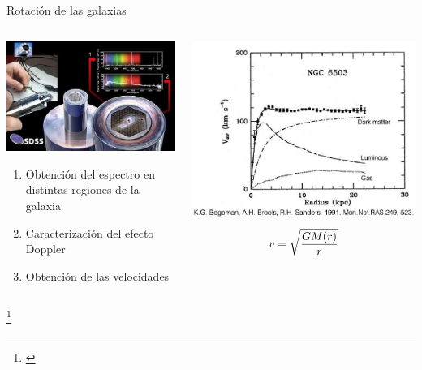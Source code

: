 \documentclass[handout]{beamer}
\newcommand\blfootnote[1]
{%
	\begingroup
	\renewcommand\thefootnote{}\footnote{#1}%
	\addtocounter{footnote}{-1}%
	\endgroup
}
\newcommand{\fcite}[1]{\blfootnote{\cite{#1}}}
\begin{document}
\begin{frame}{Rotación de las galaxias}
	\begin{columns}
		\begin{column}{0.6\textwidth}
			\includegraphics[width = 0.9\linewidth]{sources/images/SDSS.jpg} \\
			\begin{enumerate}
				\item Obtención del espectro en distintas regiones de la galaxia
				\item Caracterización del efecto Doppler
				\item Obtención de las velocidades
			\end{enumerate}
		\end{column}
		\begin{column}{0.4\textwidth}
			\includegraphics[width = \linewidth]{sources/images/rotation.jpg} \\
			\begin{equation}\small
			v = \sqrt{\dfrac{GM(r)}{r}}
			\end{equation}
		\end{column}
	\end{columns}
	
	\fcite{tegmark2006cosmological}
\end{frame}
\end{document}
